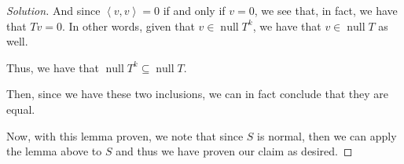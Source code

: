 \documentclass{article}
\newenvironment{solution}{\begin{proof}[Solution]}{\end{proof}}
\renewcommand\qedsymbol{$\blacksquare$}
\newenvironment{innerproof}{\renewcommand{\qedsymbol}{$\square$}\proof}{\endproof}
\DeclareMathOperator*{\vnull}{\mathrm{null}}
\newcommand{\innerproduct}[2]{\left\langle{#1}, {#2}\right\rangle}
\begin{document}
\begin{solution}
\begin{innerproof}
		And since $\innerproduct{v}{v} = 0$ if and only if $v = 0$, we see that, in fact, we have that $Tv = 0$. In other words, given that $v \in \vnull T^{k}$, we have that $v \in \vnull T$ as well.
		
		Thus, we have that $\vnull T^{k} \subseteq \vnull T$.
	
		Then, since we have these two inclusions, we can in fact conclude that they are equal.
	\end{innerproof}

	Now, with this lemma proven, we note that since $S$ is normal, then we can apply the lemma above to $S$ and thus we have proven our claim as desired.
\end{solution}
\end{document}
